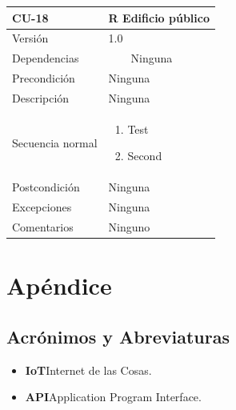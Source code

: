 \documentclass[12pt, a4paper, twoside]{article}
\newcommand\ttab{\tab \hspace{-5cm}}
\newcommand{\tabitem}{~~\llap{\textbullet}~~}
\begin{document}
\begin{longtable}{ |l|l| }
  \hline
  CU-18 & R Edificio público \\ \hline
  Versión & 1.0 \\ \hline
  Dependencias & 
    \tabitem Ninguna \\ \hline
  Precondición & Ninguna \\ \hline
  Descripción & Ninguna \\ \hline
  Secuencia normal & 
  \parbox{.45\textwidth}{
    \begin{enumerate}
      \item Test
      \item Second
    \end{enumerate}
  } \\ \hline
  Postcondición & Ninguna \\ \hline
  Excepciones & Ninguna \\ \hline
  Comentarios & Ninguno \\ \hline
\end{longtable}

\section{Apéndice}
\subsection{Acrónimos y Abreviaturas}
\begin{itemize}
    \item \textbf{IoT}\ttab Internet de las Cosas.
    \item \textbf{API}\ttab Application Program Interface.
  \end{itemize}
\end{document}
